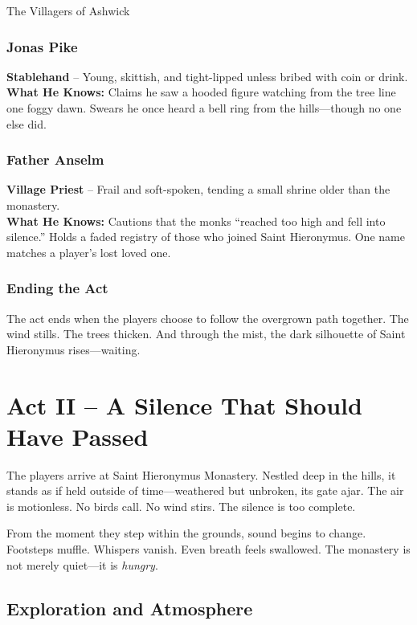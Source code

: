 \documentclass[twocolumn,nodeprecatedcode,bg=print]{dndbook/dndbook}
\begin{document}
\begin{WyrdFullNPC}[%
    name=The Villagers of Ashwick,%
    description=The last voices before the silence,%
    float=!t%
]{The Villagers of Ashwick}
    \subsubsection*{Jonas Pike}
    \textbf{Stablehand} – Young, skittish, and tight-lipped unless bribed with coin or drink.\\
    \textbf{What He Knows:} Claims he saw a hooded figure watching from the tree line one foggy dawn. Swears he once heard a bell ring from the hills—though no one else did.

    \vspace{0.5\baselineskip}
    \subsubsection*{Father Anselm}
    \textbf{Village Priest} – Frail and soft-spoken, tending a small shrine older than the monastery.\\
    \textbf{What He Knows:} Cautions that the monks “reached too high and fell into silence.” Holds a faded registry of those who joined Saint Hieronymus. One name matches a player’s lost loved one.
\end{WyrdFullNPC}

\subsubsection{Ending the Act}
The act ends when the players choose to follow the overgrown path together. The wind stills. The trees thicken. And through the mist, the dark silhouette of Saint Hieronymus rises—waiting.


\section*{Act II – A Silence That Should Have Passed}

The players arrive at Saint Hieronymus Monastery. Nestled deep in the hills, it stands as if held outside of time—weathered but unbroken, its gate ajar. The air is motionless. No birds call. No wind stirs. The silence is too complete.

From the moment they step within the grounds, sound begins to change. Footsteps muffle. Whispers vanish. Even breath feels swallowed. The monastery is not merely quiet—it is \emph{hungry}.

\subsection{Exploration and Atmosphere}
\end{document}
